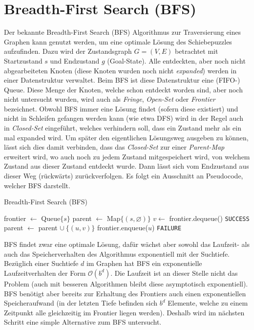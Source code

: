 \documentclass{whswinvcbook}
\begin{document}
\section{Breadth-First Search (BFS)}
Der bekannte Breadth-First Search (BFS) Algorithmus zur Traversierung eines Graphen kann genutzt werden, um eine optimale Lösung des Schiebepuzzles aufzufinden. Dazu wird der Zustandsgraph $G=(V,E)$ betrachtet mit Startzustand $s$ und Endzustand $g$ (Goal-State). Alle entdeckten, aber noch nicht abgearbeiteten Knoten (diese Knoten wurden noch nicht \textit{expanded}) werden in einer Datenstruktur verwaltet. Beim BFS ist diese Datenstruktur eine (FIFO-) Queue. Diese Menge der Knoten, welche schon entdeckt worden sind, aber noch nicht untersucht wurden, wird auch als \textit{Fringe}, \textit{Open-Set} oder \textit{Frontier} bezeichnet. Obwohl BFS immer eine Lösung findet (sofern diese existiert) und nicht in Schleifen gefangen werden kann (wie etwa DFS) wird in der Regel auch in \textit{Closed-Set} eingeführt, welches verhindern soll, dass ein Zustand mehr als ein mal expanded wird. Um später den eigentlichen Lösungsweg ausgeben zu können, lässt sich dies damit verbinden, dass das \textit{Closed-Set} zur einer \textit{Parent-Map} erweitert wird, wo auch noch zu jedem Zustand mitgespeichert wird, von welchem Zustand aus dieser Zustand entdeckt wurde. Dann lässt sich vom Endzustand aus dieser Weg (rückwärts) zurückverfolgen. Es folgt ein Ausschnitt an Pseudocode, welcher BFS darstellt.
\begin{algorithm}[H]
    \caption{Breadth-First Search (BFS)}\label{alg-bfs}
    \begin{algorithmic}[1]
            \State frontier $\gets$ Queue$\{s\}$
            \State parent $\gets$ Map$\{(s,\varnothing)\}$
            \Repeat
                \State $v\gets$ frontier.dequeue()
                    \State \Return \texttt{SUCCESS}
                \EndIf
                        \State parent $\gets$ parent $\cup\:\{(u,v)\}$
                        \State frontier.enqueue($u$)
                    \EndIf
                \EndFor
            \State \Return \texttt{FAILURE}
        \EndFunction
    \end{algorithmic}
\end{algorithm}
BFS findet zwar eine optimale Lösung, dafür wächst aber sowohl das Laufzeit- als auch das Speicherverhalten des Algorithmus exponentiell mit der Suchtiefe. Bezüglich einer Suchtiefe $d$ im Graphen hat BFS ein exponentielle Laufzeitverhalten der Form $\mathcal{O}(b^d)$. Die Laufzeit ist an dieser Stelle nicht das Problem (auch mit besseren Algorithmen bleibt diese asymptotisch exponentiell). BFS benötigt aber bereits zur Erhaltung des Frontiers auch einen exponentiellen Speicheraufwand (in der letzten Tiefe befinden sich $b^d$ Elemente, welche zu einem Zeitpunkt alle gleichzeitig im Frontier liegen werden). Deshalb wird im nächsten Schritt eine simple Alternative zum BFS untersucht.
\end{document}
